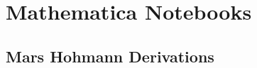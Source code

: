 \chapter{Mathematica Notebooks} \label{apx:mathematica}

\section{Mars Hohmann Derivations}\label{apx:mars-hohmann-derivations}
